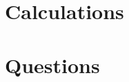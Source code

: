 \documentclass[a4paper, 11pt]{article}
\begin{document}


\section{Calculations}




\section{Questions}








\end{document}
